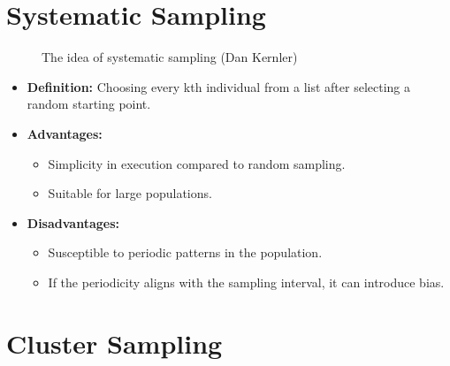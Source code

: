 \documentclass[
  a4paper,
]{scrbook}
\providecommand{\tightlist}{%
  \setlength{\itemsep}{0pt}\setlength{\parskip}{0pt}}\usepackage{longtable,booktabs,array}
\begin{document}
\section{Systematic Sampling}\label{systematic-sampling}

\begin{figure}[H]


\caption{\label{fig-syst-smpl}The idea of systematic sampling (Dan
Kernler)}

\end{figure}%

\begin{itemize}
\tightlist
\item
  \textbf{Definition:} Choosing every kth individual from a list after
  selecting a random starting point.
\item
  \textbf{Advantages:}

  \begin{itemize}
  \tightlist
  \item
    Simplicity in execution compared to random sampling.
  \item
    Suitable for large populations.
  \end{itemize}
\item
  \textbf{Disadvantages:}

  \begin{itemize}
  \tightlist
  \item
    Susceptible to periodic patterns in the population.
  \item
    If the periodicity aligns with the sampling interval, it can
    introduce bias.
  \end{itemize}
\end{itemize}

\section{Cluster Sampling}\label{cluster-sampling}
\end{document}
